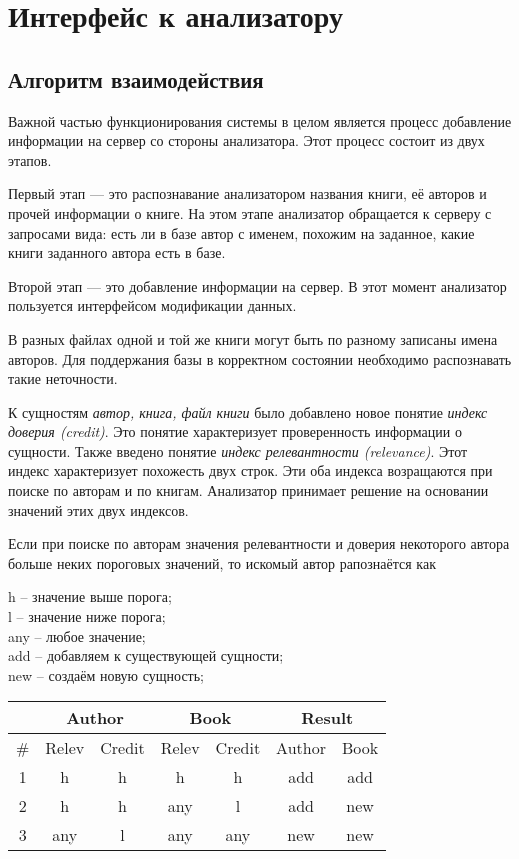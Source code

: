 \section{Интерфейс к анализатору}


\subsection{Алгоритм взаимодействия}

Важной частью функционирования системы в целом является процесс добавление информации на сервер со стороны анализатора. Этот процесс состоит из двух этапов. 

Первый этап --- это распознавание анализатором названия книги, её авторов и прочей информации о книге. На этом этапе анализатор обращается к серверу с запросами вида: есть ли в базе автор с именем, похожим на заданное, какие книги заданного автора есть в базе.

Второй этап --- это добавление информации на сервер. В этот момент анализатор пользуется интерфейсом модификации данных.


В разных файлах одной и той же книги могут быть по разному записаны имена авторов. Для поддержания базы в корректном состоянии необходимо распознавать такие неточности.

К сущностям {\em автор, книга, файл книги} было добавлено новое понятие {\em индекс доверия (credit)}. Это понятие характеризует проверенность информации о сущности.
Также введено понятие {\em индекс релевантности (relevance)}. Этот индекс характеризует похожесть двух строк.
Эти оба индекса возращаются при поиске по авторам и по книгам.
Анализатор принимает решение на основании значений этих двух индексов.

Если при поиске по авторам значения релевантности и доверия некоторого автора
больше неких пороговых значений,
то искомый автор рапознаётся как 


h -- значение выше порога;\\
l -- значение ниже порога;\\
any -- любое значение;\\
add -- добавляем к существующей сущности; \\
new -- создаём новую сущность;\\


  \begin{tabular}{ | c | c | c | c | c || c | c |}
  \hline
   & \multicolumn{2}{c|}{Author} & \multicolumn{2}{c||}{Book} & \multicolumn{2}{c|}{Result} \\
    \hline
      \# & Relev & Credit & Relev & Credit & Author & Book \\ \hline
      1 & h   & h   & h   & h   & add & add \\ \hline
      2 & h   & h   & any & l   & add & new \\ \hline
      3 & any & l   & any & any & new & new \\
    \hline
  \end{tabular}


